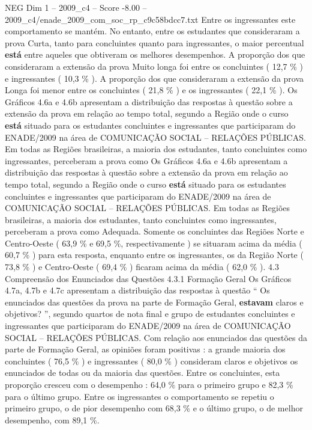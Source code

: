 \begin{textsample}{NEG Dim 1 – 2009\_c4 – Score -8.00 – 2009\_c4/enade\_2009\_com\_soc\_rp\_c9c58bdcc7.txt}
Entre os ingressantes este comportamento se mantém.
No entanto, entre os estudantes que consideraram a prova Curta, tanto para concluintes quanto para ingressantes, o maior percentual \textbf{está} entre aqueles que obtiveram os melhores desempenhos.
A proporção dos que consideraram a extensão da prova Muito longa foi entre os concluintes ( 12,7 \% ) e ingressantes ( 10,3 \% ).
A proporção dos que consideraram a extensão da prova Longa foi menor entre os concluintes ( 21,8 \% ) e os ingressantes ( 22,1 \% ).
Os Gráficos 4.6a e 4.6b apresentam a distribuição das respostas à questão sobre a extensão da prova em relação ao tempo total, segundo a Região onde o curso \textbf{está} situado para os estudantes concluintes e ingressantes que participaram do ENADE/2009 na área de COMUNICAÇÃO SOCIAL – RELAÇÕES PÚBLICAS.
Em todas as Regiões brasileiras, a maioria dos estudantes, tanto concluintes como ingressantes, perceberam a prova como Os Gráficos 4.6a e 4.6b apresentam a distribuição das respostas à questão sobre a extensão da prova em relação ao tempo total, segundo a Região onde o curso \textbf{está} situado para os estudantes concluintes e ingressantes que participaram do ENADE/2009 na área de COMUNICAÇÃO SOCIAL – RELAÇÕES PÚBLICAS.
Em todas as Regiões brasileiras, a maioria dos estudantes, tanto concluintes como ingressantes, perceberam a prova como Adequada.
Somente os concluintes das Regiões Norte e Centro-Oeste ( 63,9 \% e 69,5 \%, respectivamente ) se situaram acima da média ( 60,7 \% ) para esta resposta, enquanto entre os ingressantes, os da Região Norte ( 73,8 \% ) e Centro-Oeste ( 69,4 \% ) ficaram acima da média ( 62,0 \% ). 4.3 Compreensão dos Enunciados das Questões 4.3.1 Formação Geral Os Gráficos 4.7a, 4.7b e 4.7c apresentam a distribuição das respostas à questão “ Os enunciados das questões da prova na parte de Formação Geral, \textbf{estavam} claros e objetivos? ”, segundo quartos de nota final e grupo de estudantes concluintes e ingressantes que participaram do ENADE/2009 na área de COMUNICAÇÃO SOCIAL – RELAÇÕES PÚBLICAS.
Com relação aos enunciados das questões da parte de Formação Geral, as opiniões foram positivas : a grande maioria dos concluintes ( 76,5 \% ) e ingressantes ( 80,0 \% ) consideram claros e objetivos os enunciados de todas ou da maioria das questões.
Entre os concluintes, esta proporção cresceu com o desempenho : 64,0 \% para o primeiro grupo e 82,3 \% para o último grupo.
Entre os ingressantes o comportamento se repetiu o primeiro grupo, o de pior desempenho com 68,3 \% e o último grupo, o de melhor desempenho, com 89,1 \%.

\end{textsample}
